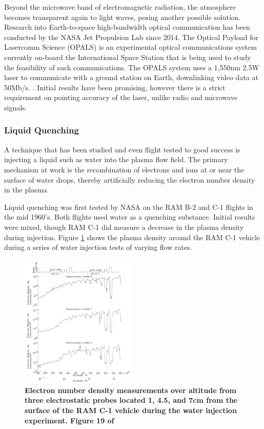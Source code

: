 \documentclass[twocolumn]{article}
\begin{document}
			Beyond the microwave band of electromagnetic radiation, the atmosphere becomes transparent again to light waves, posing another possible solution.
			Research into Earth-to-space high-bandwidth optical communication has been conducted by the NASA Jet Propulsion Lab since 2014.
			The Optical Payload for Lasercomm Science (OPALS) is an experimental optical communications system currently on-board the International Space Station that is being used to study the feasibility of such communications.
			The OPALS system uses a 1,550nm 2.5W laser to communicate with a ground station on Earth, downlinking video data at 50Mb/s. \cite{oaida_optical_2014}.
			Initial results have been promising, however there is a strict requirement on pointing accuracy of the laser, unlike radio and microwave signals. \cite{abrahamson_achieving_2015}
		
		\subsubsection*{Liquid Quenching}
			A technique that has been studied and even flight tested to good success is injecting a liquid such as water into the plasma flow field.
			The primary mechanism at work is the recombination of electrons and ions at or near the surface of water drops, thereby artificially reducing the electron number density in the plasma.\cite{evans_reduction_1965}
			
			Liquid quenching was first tested by NASA on the RAM B-2 and C-1 flights in the mid 1960's. \cite{rybak_causes_1970}
			Both flights used water as a quenching substance.
			Initial results were mixed, though RAM C-1 did measure a decrease in the plasma density during injection.
			Figure \ref{fig:RAMCWaterInject} shows the plasma density around the RAM C-1 vehicle during a series of water injection tests of varying flow rates.
			
			
			\begin{figure}
				\centering
				\includegraphics[width = 0.5\textwidth]{Images/RAMC_LangmuirWaterFlow.png}
				\caption{\textbf{Electron number density measurements over altitude from three electrostatic probes located 1, 4.5, and 7cm from the surface of the RAM C-1 vehicle during the water injection experiment. Figure 19 of \cite{akey_radio_1970}}}
				\label{fig:RAMCWaterInject}
			\end{figure}
			
\end{document}
